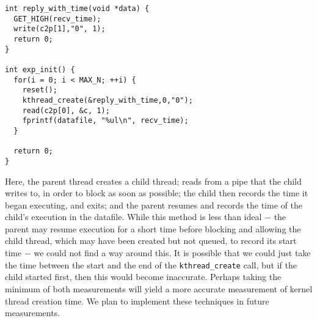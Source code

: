 \begin{verbatim}
int reply_with_time(void *data) {
  GET_HIGH(recv_time);
  write(c2p[1],"0", 1);
  return 0;
}

int exp_init() {
  for(i = 0; i < MAX_N; ++i) {
    reset();
    kthread_create(&reply_with_time,0,"0");
    read(c2p[0], &c, 1);
    fprintf(datafile, "%ul\n", recv_time);
  }

  return 0;
}
\end{verbatim}

\noindent Here, the parent thread creates a child thread; reads from a pipe that the child writes to, in order to block as soon as possible; the child then records the time it began executing, and exits; and the parent resumes and records the time of the child's execution in the datafile. 
\newline
\newline
While this method is less than ideal $-$ the parent may resume execution for a short time before blocking and allowing the child thread, which may have been created but not queued, to record its start time $-$ we could not find a way around this. It is possible that we could just take the time between the start and the end of the {\tt kthread\_create} call, but if the child started first, then this would become inaccurate. Perhaps taking the minimum of both measurements will yield a more accurate measurement of kernel thread creation time. We plan to implement these techniques in future measurements.